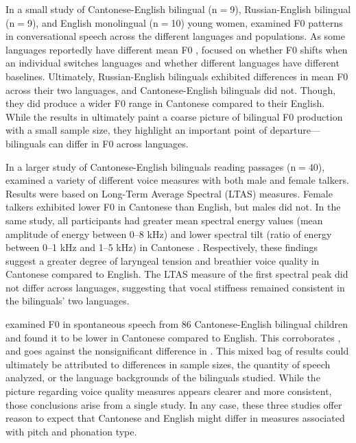 In a small study of Cantonese-English bilingual (n$=$9), Russian-English bilingual (n$=$9), and English monolingual (n$=$10) young women, \citet{altenberg_2006_f0} examined F0 patterns in conversational speech across the different languages and populations. As some languages reportedly have different mean F0 \citep[e.g.,][]{keating_2012_f0}, \citet{altenberg_2006_f0} focused on whether F0 shifts when an individual switches languages and whether different languages have different baselines. Ultimately, Russian-English bilinguals exhibited differences in mean F0 across their two languages, and Cantonese-English bilinguals did not. Though, they did produce a wider F0 range in Cantonese compared to their English. While the results in \citet{altenberg_2006_f0} ultimately paint a coarse picture of bilingual F0 production with a small sample size, they highlight an important point of departure---bilinguals can differ in F0 across languages. 

In a larger study of Cantonese-English bilinguals reading passages (n$=$40), \citet{ng_2012_ltas} examined a variety of different voice measures with both male and female talkers. Results were based on Long-Term Average Spectral (LTAS) measures. Female talkers exhibited lower F0 in Cantonese than English, but males did not. In the same study, all participants had greater mean spectral energy values (mean amplitude of energy between 0--8 kHz) and lower spectral tilt (ratio of energy between 0--1 kHz and 1--5 kHz) in Cantonese \citep{ng_2012_ltas}. Respectively, these findings suggest a greater degree of laryngeal tension and breathier voice quality in Cantonese compared to English. The LTAS measure of the first spectral peak did not differ across languages, suggesting that vocal stiffness remained consistent in the bilinguals' two languages. 

\citet{ng_2010_voice} examined F0 in spontaneous speech from 86 Cantonese-English bilingual children and found it to be lower in Cantonese compared to English. This corroborates \citet{ng_2012_ltas}, and goes against the nonsignificant difference in \citet{altenberg_2006_f0}. This mixed bag of results could ultimately be attributed to differences in sample sizes, the quantity of speech analyzed, or the language backgrounds of the bilinguals studied. While the picture regarding voice quality measures appears clearer and more consistent, those conclusions arise from a single study. In any case, these three studies offer reason to expect that Cantonese and English might differ in measures associated with pitch and phonation type. 


